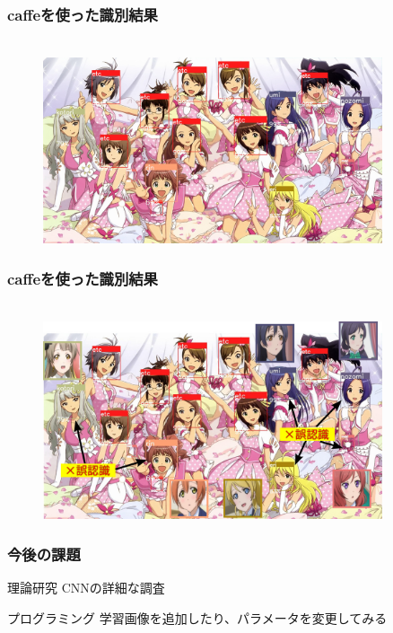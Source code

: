 \documentclass[dvipdfmx,11pt,notheorems]{beamer}
\theoremstyle{definition}
\begin{document}
\begin{frame}\frametitle{caffeを使った識別結果}

\begin{figure}[t]
  \centering
   \\
  \centering
  \includegraphics[width=100mm]{./fig/jpg/result_idolmaster.jpg} \\
\end{figure}
\end{frame}

\begin{frame}\frametitle{caffeを使った識別結果}

\begin{figure}[t]
  \centering
   \\
  \centering
  \includegraphics[width=100mm]{./fig/jpg/result_idol_compare.jpg} \\
\end{figure}
\end{frame}

\begin{frame}\frametitle{今後の課題}

\begin{block}{理論研究}
CNNの詳細な調査
\end{block}

\vspace{1cm}
\begin{exampleblock}{プログラミング}
学習画像を追加したり、パラメータを変更してみる
\end{exampleblock}
\end{frame}
\end{document}
